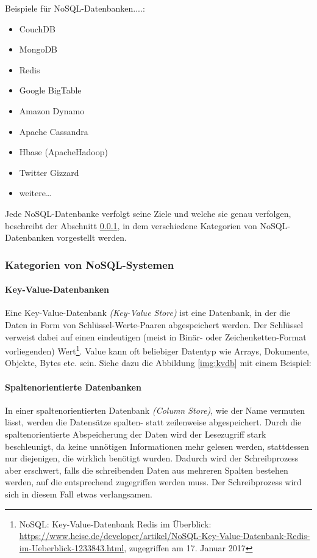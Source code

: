 Beispiele für NoSQL-Datenbanken....:
\begin{multicols}{2}
\begin{itemize}
\item CouchDB
\item MongoDB
\item Redis
\item Google BigTable
\item Amazon Dynamo
\item Apache Cassandra
\item Hbase (ApacheHadoop)
\item Twitter Gizzard
\item weitere…
\end{itemize}
\end{multicols}
Jede NoSQL-Datenbanke verfolgt seine Ziele und welche sie genau verfolgen, beschreibt der Abschnitt \ref{categoryNoSQL}, in dem verschiedene Kategorien von NoSQL-Datenbanken vorgestellt werden.

\subsubsection{Kategorien von NoSQL-Systemen}\label{categoryNoSQL}

\paragraph{Key-Value-Datenbanken}

Eine Key-Value-Datenbank \textit{(Key-Value Store)} ist eine Datenbank, in der die Daten in Form von Schlüssel-Werte-Paaren abgespeichert werden. Der Schlüssel verweist dabei auf einen eindeutigen (meist in Binär- oder Zeichenketten-Format vorliegenden) Wert\footnote{NoSQL: Key-Value-Datenbank Redis im Überblick: \url{https://www.heise.de/developer/artikel/NoSQL-Key-Value-Datenbank-Redis-im-Ueberblick-1233843.html}, zugegriffen am 17. Januar 2017}. Value kann oft beliebiger Datentyp wie Arrays, Dokumente, Objekte, Bytes etc. sein. Siehe dazu die Abbildung \ref{img:kvdb} mit einem Beispiel:


\paragraph{Spaltenorientierte Datenbanken}

In einer spaltenorientierten Datenbank \textit{(Column Store)}, wie der Name vermuten lässt, werden die Datensätze spalten- statt zeilenweise abgespeichert. Durch die spaltenorientierte Abspeicherung der Daten wird der Lesezugriff stark beschleunigt, da keine unnötigen Informationen mehr gelesen werden, stattdessen nur diejenigen, die wirklich benötigt wurden. Dadurch wird der Schreibprozess aber erschwert, falls die schreibenden Daten aus mehreren Spalten bestehen werden, auf die entsprechend zugegriffen werden muss. Der Schreibprozess wird sich in diesem Fall etwas verlangsamen.


